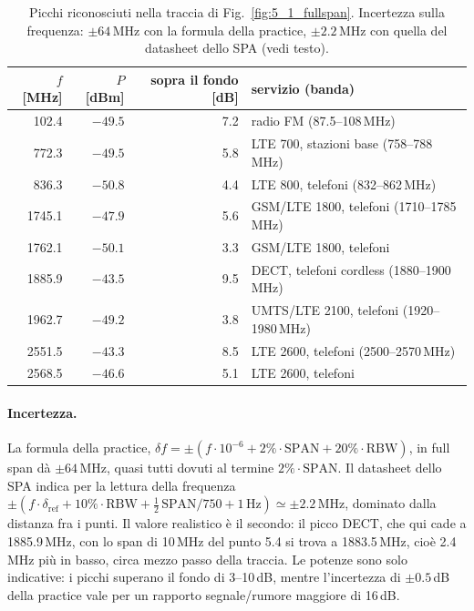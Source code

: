 \documentclass[11pt,a4paper,oneside]{book}
\begin{document}
\begin{table}[H]
\centering\small
\renewcommand{\arraystretch}{1.15}
\begin{tabular}{r r r l}
\hline
$f$ [MHz] & $P$ [dBm] & sopra il fondo [dB] & servizio (banda) \\ \hline
102.4  & $-49.5$ & 7.2 & radio FM (87.5--108\,MHz) \\
772.3  & $-49.5$ & 5.8 & LTE 700, stazioni base (758--788\,MHz) \\
836.3  & $-50.8$ & 4.4 & LTE 800, telefoni (832--862\,MHz) \\
1745.1 & $-47.9$ & 5.6 & GSM/LTE 1800, telefoni (1710--1785\,MHz) \\
1762.1 & $-50.1$ & 3.3 & GSM/LTE 1800, telefoni \\
1885.9 & $-43.5$ & 9.5 & DECT, telefoni cordless (1880--1900\,MHz) \\
1962.7 & $-49.2$ & 3.8 & UMTS/LTE 2100, telefoni (1920--1980\,MHz) \\
2551.5 & $-43.3$ & 8.5 & LTE 2600, telefoni (2500--2570\,MHz) \\
2568.5 & $-46.6$ & 5.1 & LTE 2600, telefoni \\ \hline
\end{tabular}
\caption{Picchi riconosciuti nella traccia di Fig.~\ref{fig:5_1_fullspan}. Incertezza sulla frequenza: $\pm 64$\,MHz con la formula della practice, $\pm 2.2$\,MHz con quella del datasheet dello SPA (vedi testo).}
\label{tab:5_1_picchi}
\end{table}

\paragraph{Incertezza.} La formula della practice, $\delta f = \pm(f\cdot 10^{-6} + 2\%\cdot\mathrm{SPAN} + 20\%\cdot\mathrm{RBW})$, in full span dà $\pm 64$\,MHz, quasi tutti dovuti al termine $2\%\cdot\mathrm{SPAN}$. Il datasheet dello SPA indica per la lettura della frequenza $\pm(f\cdot\delta_{\mathrm{ref}} + 10\%\cdot\mathrm{RBW} + \tfrac12\,\mathrm{SPAN}/750 + 1\,\mathrm{Hz}) \simeq \pm 2.2$\,MHz, dominato dalla distanza fra i punti. Il valore realistico è il secondo: il picco DECT, che qui cade a 1885.9\,MHz, con lo span di 10\,MHz del punto 5.4 si trova a 1883.5\,MHz, cioè 2.4\,MHz più in basso, circa mezzo passo della traccia. Le potenze sono solo indicative: i picchi superano il fondo di 3--10\,dB, mentre l'incertezza di $\pm 0.5$\,dB della practice vale per un rapporto segnale/rumore maggiore di 16\,dB.
\end{document}
